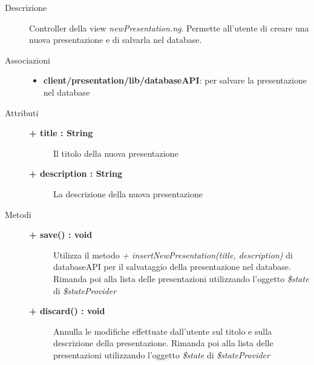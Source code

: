 \begin{description}
\item[Descrizione] \hfill
	Controller della view \textit{newPresentation.ng}. Permette all'utente di creare una nuova presentazione e di salvarla nel database.
	

\item[Associazioni] \hfill
	\begin{itemize}
		\item \textbf{client/presentation/lib/databaseAPI}: per salvare la presentazione nel database
	\end{itemize}

	
\item[Attributi] \hfill
	\begin{description}
		\item[\textbf{+ title : String			}] \hfill
		Il titolo della nuova presentazione
		\item[\textbf{+ description : String			}] \hfill	
		La descrizione della nuova presentazione
	\end{description}
	
	
\item[Metodi] \hfill

	\begin{description}
		\item[\textbf{\color{blue}+ save() : void			}] \hfill
			Utilizza il metodo \textit{+ insertNewPresentation(title, description)} di databaseAPI per il salvataggio della presentazione nel database. Rimanda poi alla lista delle presentazioni utilizzando l'oggetto \textit{\$state} di \textit{\$stateProvider}
	\end{description}
	
	\begin{description}
		\item[\textbf{\color{blue}+ discard() : void			}] \hfill
			Annulla le modifiche effettuate dall'utente sul titolo e sulla descrizione della presentazione. Rimanda poi alla lista delle presentazioni utilizzando l'oggetto \textit{\$state} di \textit{\$stateProvider}
	\end{description}
	
	
	
\end{description}




